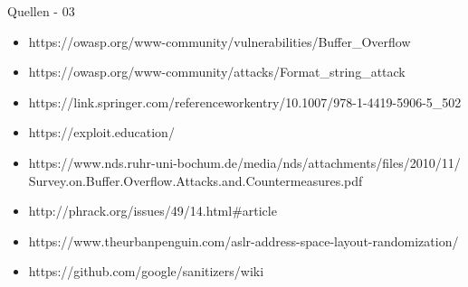 \begin{frame}{Quellen - 03}
    \begin{itemize}
        \item https://owasp.org/www-community/vulnerabilities/Buffer\_Overflow
        \item https://owasp.org/www-community/attacks/Format\_string\_attack
        \item https://link.springer.com/referenceworkentry/10.1007/978-1-4419-5906-5\_502
        \item https://exploit.education/
        \item https://www.nds.ruhr-uni-bochum.de/media/nds/attachments/files/2010/11/\\Survey.on.Buffer.Overflow.Attacks.and.Countermeasures.pdf
        \item http://phrack.org/issues/49/14.html\#article
        \item https://www.theurbanpenguin.com/aslr-address-space-layout-randomization/
        \item https://github.com/google/sanitizers/wiki
    \end{itemize}
\end{frame}